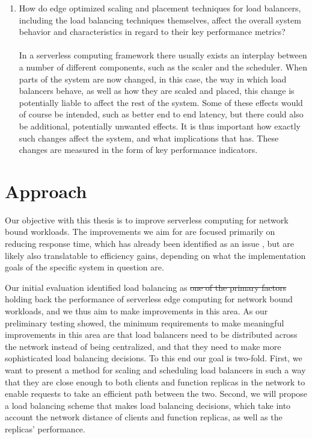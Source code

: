 \documentclass[draft,final]{vutinfth} %
\providecommand{\DIFaddtex}[1]{{\protect\color{blue}\uwave{#1}}} %
\providecommand{\DIFdeltex}[1]{{\protect\color{red}\sout{#1}}}                      %
\providecommand{\DIFaddbegin}{} %
\providecommand{\DIFaddend}{} %
\providecommand{\DIFdelbegin}{} %
\providecommand{\DIFdelend}{} %
\providecommand{\DIFadd}[1]{\texorpdfstring{\DIFaddtex{#1}}{#1}} %
\providecommand{\DIFdel}[1]{\texorpdfstring{\DIFdeltex{#1}}{}} %
\begin{document}
\begin{enumerate}
        \item How do edge optimized scaling and placement techniques for load balancers, including the load balancing techniques themselves, affect the overall system behavior and characteristics in regard to their key performance metrics?\\\\
    In a serverless computing framework there usually exists an interplay between a number of different components, such as the scaler and the scheduler\cite{openfaas}\cite{kubernetes}. 
    When parts of the system are now changed, in this case, the way in which load balancers behave, as well as how they are scaled and placed, this change is potentially liable to affect the rest of the system. Some of these effects would of course be intended, such as better end to end latency, but there could also be additional, potentially unwanted effects. It is thus important how exactly such changes affect the system, and what implications that has. These changes are measured in the form of key performance indicators.
\end{enumerate}
\section{Approach}
Our objective with this thesis is to improve serverless computing for network bound workloads. 
The improvements we aim for are focused primarily on reducing response time, which has already been identified as an issue \cite{skippy}, but are likely also translatable to efficiency gains, depending on what the implementation goals of the specific system in question are.


Our initial evaluation identified load balancing as \DIFdelbegin \DIFdel{one of the primary factors }\DIFdelend \DIFaddbegin \DIFadd{the primary factor }\DIFaddend holding back the performance of serverless edge computing for network bound workloads, and we thus aim to make improvements in this area.
As our preliminary testing showed, the minimum requirements to make meaningful improvements in this area are that load balancers need to be distributed across the network  instead of being centralized, and that they need to make more sophisticated load balancing decisions.
To this end our goal is two-fold.
First, we want to present a method for scaling and scheduling load balancers in such a way that they are close enough to both clients and function replicas in the network to enable requests to take an efficient path between the two.
Second, we will propose a load balancing scheme that makes load balancing decisions, which take into account the network distance of clients and function replicas, as well as the replicas' performance.
\end{document}
